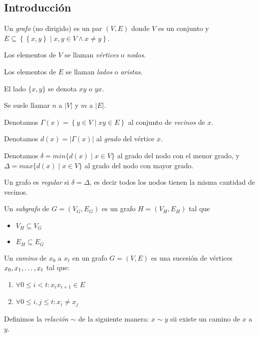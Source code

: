 \subsection{Introducción}

\begin{definition}
  Un \emph{grafo} (no dirigido) es un par $(V, E)$ donde $V$ es un conjunto y
  $E \subseteq \left\{\left\{x,y\right\} \mid x,y \in V \wedge x \neq y \right\}$.
\end{definition}

\begin{notation}
  Los elementos de $V$ se llaman \emph{vértices} o \emph{nodos}.

  Los elementos de $E$ se llaman \emph{lados} o \emph{aristas}.

  El lado $\{x,y\}$ se denota $xy$ o $yx$.

  Se suele llamar $n$ a $|V|$ y $m$ a $|E|$.

  Denotamos $\Gamma(x) = \left\{y \in V \mid xy \in E \right\}$ al conjunto de
  \emph{vecinos} de $x$.

  Denotamos $d(x) = |\Gamma(x)|$ al \emph{grado} del vértice $x$.

  Denotamos $\delta = min\{d(x) \mid x\in V\}$ al grado del nodo con el menor
  grado, y $\Delta = max\{d(x) \mid x\in V\}$ al grado del nodo con mayor grado.

\end{notation}

\begin{definition}
  Un grafo es \emph{regular} si $\delta = \Delta$, es decir todos los nodos
  tienen la misma cantidad de vecinos.
\end{definition}

\begin{definition}
  Un \emph{subgrafo} de $G = (V_G,E_G)$ es un grafo $H = (V_H,E_H)$ tal que 
  \begin{itemize}
    \item $V_H \subseteq V_G$
    \item $E_H \subseteq E_G$
  \end{itemize}
\end{definition}

\begin{definition}
  Un \emph{camino} de $x_0$ a $x_t$ en un grafo $G = (V,E)$ es una sucesión de
  vértices $x_0, x_1, \mathellipsis, x_t$ tal que:
\begin{enumerate}
    \item $\forall 0 \le i < t \colon x_i x_{i+1} \in E$
    \item $\forall 0 \le i, j \le t \colon x_i \neq x_j$
\end{enumerate}

Definimos la \emph{relación} $\sim$ de la siguiente manera: $x \sim y$ sii existe un camino de $x$ a $y$.
\end{definition}

